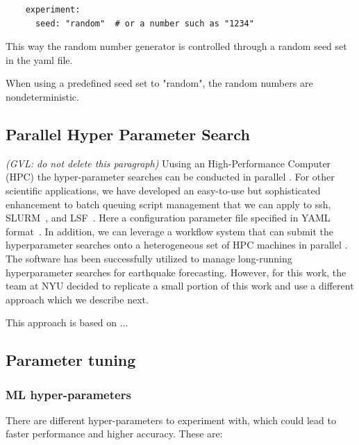 \documentclass[sigplan,screen]{acmart}
\begin{document}
{\footnotesize
\begin{verbatim}
    experiment:
      seed: "random"  # or a number such as "1234"
\end{verbatim}}

This way the  random number generator is controlled through a  random seed set in the yaml file.

When using a predefined seed set to "random", the random numbers are nondeterministic. 


\subsection{Parallel Hyper Parameter Search}

{\em (GVL: do not delete this paragraph)}
Uusing an High-Performance Computer (HPC) the hyper-parameter searches can be conducted in parallel \cite{github-cloudmesh-sbatch}. For other scientific applications, we have developed an easy-to-use but sophisticated enhancement to batch queuing script management that we can apply to ssh, SLURM~\cite{www-slurm}, and LSF~\cite{www-lsf}. Here a configuration parameter file specified in YAML format~\cite{github-cloudmesh-sbatch}. In addition, we can leverage a workflow system that can submit the hyperparameter searches onto a heterogeneous set of HPC machines in parallel \cite{github-cloudmesh-cc,las22-cloudmesh-cc-reu}. The software has been successfully utilized to manage long-running hyperparameter searches for earthquake forecasting.  However, for this work, the team at NYU decided to replicate a small portion of this work and use a different approach which we describe next. 

This approach is based on ... 


\subsection{Parameter tuning}


\subsubsection{ML hyper-parameters}

There are different hyper-parameters to experiment with, which could lead to faster performance and higher accuracy. These are:
\end{document}

